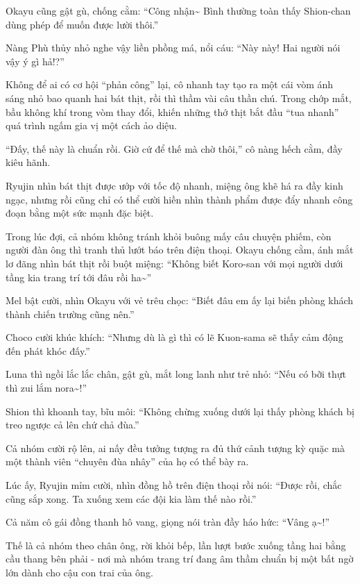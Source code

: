 \documentclass[../main.tex]{subfiles}
\begin{document}
Okayu cũng gật gù, chống cằm: ``Công nhận\~{} Bình thường toàn thấy Shion-chan dùng phép để muốn được lười thôi.''

Nàng Phù thủy nhỏ nghe vậy liền phồng má, nổi cáu: ``Này này! Hai người nói vậy ý gì hả!?''

Không để ai có cơ hội ``phản công'' lại, cô nhanh tay tạo ra một cái vòm ánh sáng nhỏ bao quanh hai bát thịt, rồi thì thầm vài câu thần chú. Trong chớp mắt, bầu không khí trong vòm thay đổi, khiến những thớ thịt bắt đầu ``tua nhanh'' quá trình ngấm gia vị một cách ảo diệu.

``Đấy, thế này là chuẩn rồi. Giờ cứ để thế mà chờ thôi,'' cô nàng hếch cằm, đầy kiêu hãnh.

Ryujin nhìn bát thịt được ướp với tốc độ nhanh, miệng ông khẽ há ra đầy kinh ngạc, nhưng rồi cũng chỉ có thể cười hiền nhìn thành phẩm được đẩy nhanh công đoạn bằng một sức mạnh đặc biệt.

Trong lúc đợi, cả nhóm không tránh khỏi buông mấy câu chuyện phiếm, còn người đàn ông thì tranh thủ lướt báo trên điện thoại. Okayu chống cằm, ánh mắt lơ đãng nhìn bát thịt rồi buột miệng: ``Không biết Koro-san với mọi người dưới tầng kia trang trí tới đâu rồi ha\~{}''

Mel bật cười, nhìn Okayu với vẻ trêu chọc: ``Biết đâu em ấy lại biến phòng khách thành chiến trường cũng nên.''

Choco cười khúc khích: ``Nhưng dù là gì thì có lẽ Kuon-sama sẽ thấy cảm động đến phát khóc đấy.''

Luna thì ngồi lắc lắc chân, gật gù, mắt long lanh như trẻ nhỏ: ``Nếu có bỡi thựt thì zui lắm nora\~{}!''

Shion thì khoanh tay, bĩu môi: ``Không chừng xuống dưới lại thấy phòng khách bị treo ngược cả lên chứ chả đùa.''

Cả nhóm cười rộ lên, ai nấy đều tưởng tượng ra đủ thứ cảnh tượng kỳ quặc mà một thành viên ``chuyên đùa nhây'' của họ có thể bày ra.

Lúc ấy, Ryujin mỉm cười, nhìn đồng hồ trên điện thoại rồi nói: ``Được rồi, chắc cũng sắp xong. Ta xuống xem các đội kia làm thế nào rồi.''

Cả năm cô gái đồng thanh hô vang, giọng nói tràn đầy háo hức: ``Vâng ạ\~{}!''

Thế là cả nhóm theo chân ông, rời khỏi bếp, lần lượt bước xuống tầng hai bằng cầu thang bên phải - nơi mà nhóm trang trí đang âm thầm chuẩn bị một bất ngờ lớn dành cho cậu con trai của ông.

\subsubsection*{\label{P4.1b}}
\end{document}
